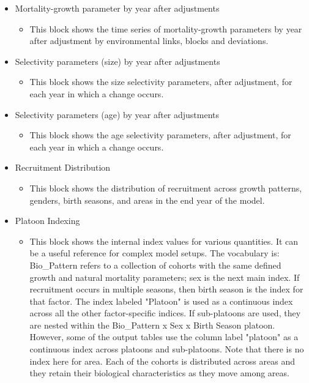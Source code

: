 \begin{itemize}
	\item Mortality-growth parameter by year after adjustments
	\begin{itemize}
		\item This block shows the time series of mortality-growth parameters by year after adjustment by environmental links, blocks and deviations.
	\end{itemize}
	\item Selectivity parameters (size) by year after adjustments
	\begin{itemize}
		\item This block shows the size selectivity parameters, after adjustment, for each year in which a change occurs.
	\end{itemize}
	\item Selectivity parameters (age) by year after adjustments
	\begin{itemize}
		\item This block shows the age selectivity parameters, after adjustment, for each year in which a change occurs.
	\end{itemize}
	\item Recruitment Distribution
	\begin{itemize}
		\item This block shows the distribution of recruitment across growth patterns, genders, birth seasons, and areas in the end year of the model.
	\end{itemize}
	\item Platoon Indexing
	\begin{itemize}
		\item This block shows the internal index values for various quantities.  It can be a useful reference for complex model setups. The vocabulary is: Bio\_Pattern refers to a collection of cohorts with the same defined growth and natural mortality parameters; sex is the next main index. If recruitment occurs in multiple seasons, then birth season is the index for that factor. The index labeled "Platoon" is used as a continuous index across all the other factor-specific indices. If sub-platoons are used, they are nested within the Bio\_Pattern x Sex x Birth Season platoon. However, some of the output tables use the column label "platoon" as a continuous index across platoons and sub-platoons. Note that there is no index here for area. Each of the cohorts is distributed across areas and they retain their biological characteristics as they move among areas.
	\end{itemize}

\end{itemize}
